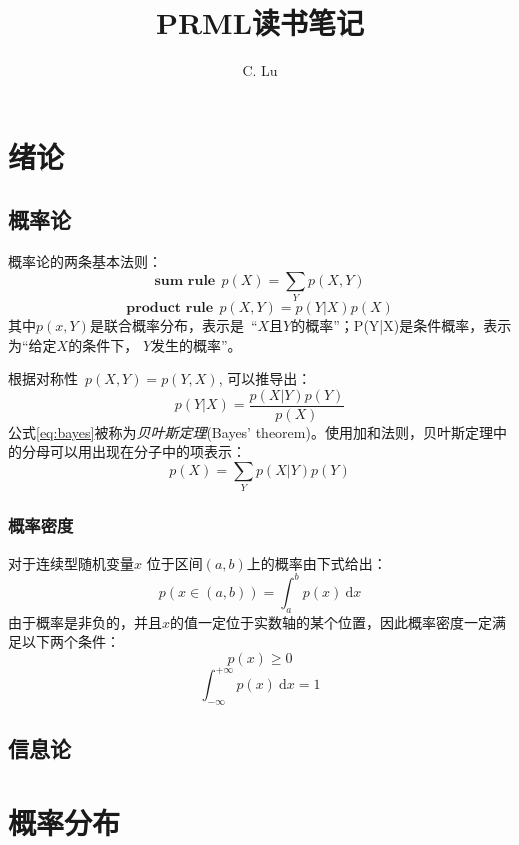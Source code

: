 \documentclass[11pt]{ctexbook}
\title{\textbf{PRML读书笔记} }
\author{C. Lu}
\begin{document}
\maketitle
\tableofcontents

\chapter{绪论}
\section{概率论}
概率论的两条基本法则：
\begin{equation} 
	\mathrm{\textbf{sum rule}} \ \ p(X) = \sum_Y p(X, Y)
\end{equation}
\begin{equation} 
	\mathrm{\textbf{product rule}} \ \ p(X, Y) = p(Y|X)p(X)
\end{equation}
其中$p(x, Y)$是联合概率分布，表示是\ “$X$且$Y$的概率”；P(Y|X)是条件概率，表示为“给定$X$的条件下， $Y$发生的概率”。

根据对称性\ $p(X, Y) = p(Y, X)$, 可以推导出：
\begin{equation}
	\label{eq:bayes}
	p(Y|X) = \frac{p(X|Y)p(Y)}{p(X)}
\end{equation}
公式\ref{eq:bayes}被称为\emph{贝叶斯定理}(Bayes' theorem)。使用加和法则，贝叶斯定理中的分母可以用出现在分子中的项表示：
\begin{equation}
	p(X) = \sum_Y p(X|Y)p(Y)
\end{equation}
\subsection{概率密度}
对于连续型随机变量$x$ 位于区间$ (a, b)$上的概率由下式给出：
\begin{equation}
	p(x\in(a, b)) = \int_{a}^{b}p(x)\ \mathrm{d}x
\end{equation}
由于概率是非负的，并且$x$的值一定位于实数轴的某个位置，因此概率密度一定满足以下两个条件：
\begin{equation}
	p(x) \geqslant 0
\end{equation}
\begin{equation}
	\int_{-\infty}^{+\infty}p(x)\ \mathrm{d}x= 1
\end{equation}
\section{信息论}

\chapter{概率分布}
\end{document}
